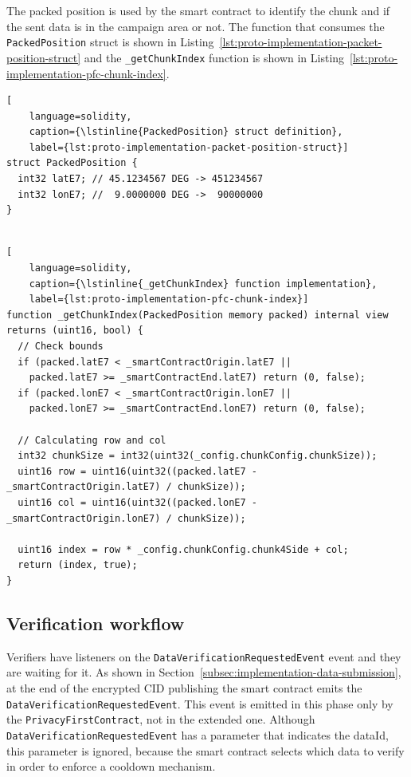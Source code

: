 The packed position is used by the smart contract to identify the chunk and if the sent data is in the campaign area or not.
The function that consumes the \lstinline{PackedPosition} struct is shown in Listing~\ref{lst:proto-implementation-packet-position-struct} and the \lstinline{_getChunkIndex} function is shown in Listing~\ref{lst:proto-implementation-pfc-chunk-index}.

\begin{lstlisting}[
    language=solidity,
    caption={\lstinline{PackedPosition} struct definition},
    label={lst:proto-implementation-packet-position-struct}]
struct PackedPosition {
  int32 latE7; // 45.1234567 DEG -> 451234567
  int32 lonE7; //  9.0000000 DEG ->  90000000
}


\end{lstlisting}

\begin{lstlisting}[
    language=solidity,
    caption={\lstinline{_getChunkIndex} function implementation},
    label={lst:proto-implementation-pfc-chunk-index}]
function _getChunkIndex(PackedPosition memory packed) internal view returns (uint16, bool) {
  // Check bounds
  if (packed.latE7 < _smartContractOrigin.latE7 ||
    packed.latE7 >= _smartContractEnd.latE7) return (0, false);
  if (packed.lonE7 < _smartContractOrigin.lonE7 ||
    packed.lonE7 >= _smartContractEnd.lonE7) return (0, false);

  // Calculating row and col
  int32 chunkSize = int32(uint32(_config.chunkConfig.chunkSize));
  uint16 row = uint16(uint32((packed.latE7 - _smartContractOrigin.latE7) / chunkSize));
  uint16 col = uint16(uint32((packed.lonE7 - _smartContractOrigin.lonE7) / chunkSize));

  uint16 index = row * _config.chunkConfig.chunk4Side + col;
  return (index, true);
}

\end{lstlisting}

\subsection{Verification workflow}\label{subsec:implementation-verification}
Verifiers have listeners on the \lstinline{DataVerificationRequestedEvent} event and they are waiting for it.
As shown in Section~\ref{subsec:implementation-data-submission}, at the end of the encrypted CID publishing the smart contract emits the \lstinline{DataVerificationRequestedEvent}.
This event is emitted in this phase only by the \texttt{PrivacyFirstContract}, not in the extended one.
Although \lstinline{DataVerificationRequestedEvent} has a parameter that indicates the dataId, this parameter is ignored, because the smart contract selects which data to verify in order to enforce a cooldown mechanism.

